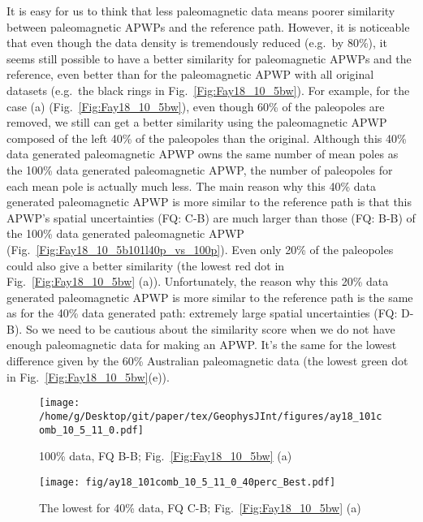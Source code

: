 It is easy for us to think that less paleomagnetic data means poorer similarity
between paleomagnetic APWPs and the reference path. However, it is noticeable
that even though the data density is tremendously reduced (e.g.\ by 80\%), it
seems still possible to have a better similarity for paleomagnetic APWPs and the
reference, even better than for the paleomagnetic APWP with all original
datasets (e.g.\ the black rings in Fig.~\ref{Fig:Fay18_10_5bw}). For example,
for the case (a) (Fig.~\ref{Fig:Fay18_10_5bw}), even though 60\% of the
paleopoles are removed, we still can get a better similarity using the
paleomagnetic APWP composed of the left 40\% of the paleopoles than the
original. Although this 40\% data generated paleomagnetic APWP owns the same
number of mean poles as the 100\% data generated paleomagnetic APWP, the
number of paleopoles for each mean pole is actually much less. The main reason
why this 40\% data generated paleomagnetic APWP is more similar to the
reference path is that this APWP's spatial uncertainties (FQ: C-B) are much
larger than those (FQ: B-B) of the 100\% data generated paleomagnetic APWP
(Fig.~\ref{Fig:Fay18_10_5b101l40p_vs_100p}). Even only 20\% of the paleopoles
could also give a better similarity (the lowest red dot in
Fig.~\ref{Fig:Fay18_10_5bw} (a)). Unfortunately, the reason why this 20\% data
generated paleomagnetic APWP is more similar to the reference path is the same
as for the 40\% data generated path: extremely large spatial uncertainties (FQ:
D-B). So we need to be cautious about the similarity score when we do not have
enough paleomagnetic data for making an APWP\@. It's the same for the lowest
difference given by the 60\% Australian paleomagnetic data (the lowest green dot
in Fig.~\ref{Fig:Fay18_10_5bw}(e)).

\begin{figure*}[tbp]
  \captionsetup[subfigure]{labelformat=empty,aboveskip=-6pt,belowskip=-6pt}
  \centering
  \begin{subfigure}[htbp]{.49\textwidth}
    \captionsetup{skip=0pt}  %
    \centering
    \texttt{[image: /home/g/Desktop/git/paper/tex/GeophysJInt/figures/ay18\_101comb\_10\_5\_11\_0.pdf]}
	\caption{100\% data, FQ B-B; Fig.~\ref{Fig:Fay18_10_5bw}
	(a)}\label{Fig:Fay18_10_5b101}
  \end{subfigure}
  \begin{subfigure}[htbp]{.49\textwidth}
    \captionsetup{skip=0pt}
    \centering
    \texttt{[image: fig/ay18\_101comb\_10\_5\_11\_0\_40perc\_Best.pdf]}
    \caption{The lowest for 40\% data, FQ C-B;
	Fig.~\ref{Fig:Fay18_10_5bw} (a)}\label{Fig:Fay18_10_5b101l40p}
  \end{subfigure}
  \caption[Less data, better similarity?]{Comparing the 100\% North American
  120 Ma paleomagnetic data derived result with the best of the only
  40\% data (giving even better similarity) derived results (the lowest yellow
  dot in Fig.~\ref{Fig:Fay18_10_5bw} (a)).}\label{Fig:Fay18_10_5b101l40p_vs_100p}
\end{figure*}

